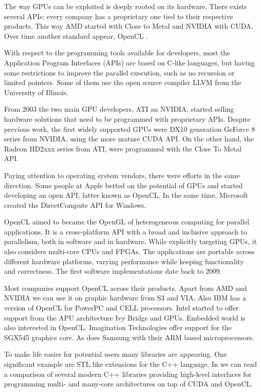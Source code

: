 \documentclass[review]{elsarticle}
\begin{document}
The way GPUs can be exploited is deeply rooted on its hardware. There exists several APIs: every company has a proprietary one tied to their respective products. This way AMD started with Close to Metal and NVIDIA with CUDA. Over time another standard appear, OpenCL \cite{opencl}.

With respect to the programming tools available for developers, most the Application Program Interfaces (APIs) are based on C-like languages, but having some restrictions to improve the parallel execution, such as no recursion or limited pointers. Some of them use the open source compiler LLVM \cite{LLVM} from the University of Illinois.

From 2003 the two main GPU developers, ATI an NVIDIA, started selling hardware solutions that need to be programmed with proprietary APIs. Despite previous work, the first widely supported GPUs were DX10 generation GeForce 8 series from NVIDIA, using the more mature CUDA API. On the other hand, the Radeon HD2xxx series from ATI, were programmed with the Close To Metal API. 

Paying attention to operating system vendors, there were efforts in the same direction. Some people at Apple betted on the potential of GPUs and started developing an open API, latter known as OpenCL. In the same time, Microsoft created the DirectCompute API for Windows.

OpenCL aimed to became the OpenGL of heterogeneous computing for parallel applications. It is a cross-platform API with a broad and inclusive approach to parallelism, both in software and in hardware. While explicitly targeting GPUs, it also considers multi-core CPUs and FPGAs. The applications are portable across different hardware platforms, varying performance while keeping functionality and correctness. The first software implementations date back to 2009.

Most companies support OpenCL across their products. Apart from AMD and NVIDIA we can use it on graphic hardware from S3 and VIA. Also IBM has a version of OpenCL for PowerPC and CELL processors. Intel started to offer support from the APU architecture Ivy Bridge and GPUs. Embedded world is also interested in OpenCL. Imagination Technologies offer support for the SGX545 graphics core. As does Samsung with their ARM based microprocessors.

To make life easier for potential users many libraries are appearing. One significant example are STL like extensions for the C++ language. In \cite{doi:10.1137/120903683} we can read a comparison of several modern C++ libraries providing high-level interfaces for programming multi- and many-core architectures on top of CUDA and OpenCL.
\end{document}
